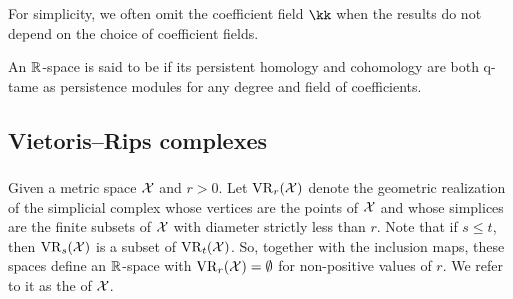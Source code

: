 For simplicity, we often omit the coefficient field $\kk$ when the results do not depend on the choice of coefficient fields.

An $\mathbb{R}$-space is said to be  if its persistent homology and cohomology are both q-tame as persistence modules for any degree and field of coefficients.

%
%
%

\subsection{Vietoris--Rips complexes}

\subsubsection{}

Given a metric space $\mathcal{X}$ and $r > 0$.
Let $\operatorname{VR}_r(\mathcal{X})$ denote the geometric realization of the simplicial complex whose vertices are the points of $\mathcal{X}$ and whose simplices are the finite subsets of $\mathcal{X}$ with diameter strictly less than $r$.
Note that if $s \leq t$, then $\operatorname{VR}_s(\mathcal{X})$ is a subset of $\operatorname{VR}_t(\mathcal{X})$.
So, together with the inclusion maps, these spaces define an $\mathbb{R}$-space with $\operatorname{VR}_r(\mathcal{X}) = \emptyset$ for non-positive values of $r$.
We refer to it as the  of $\mathcal{X}$.

